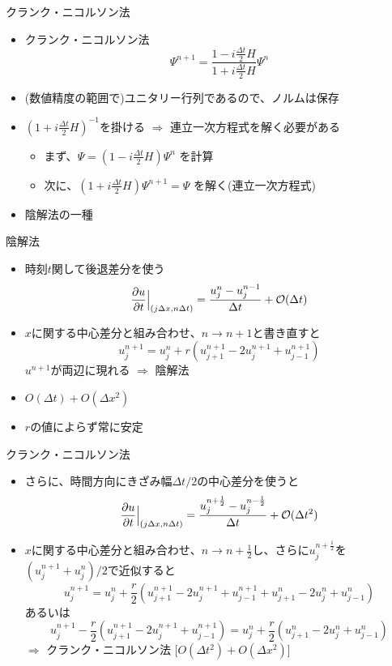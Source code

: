 \begin{frame}[t]{クランク・ニコルソン法}
  \begin{itemize}
  \item クランク・ニコルソン法
    \[
    \Psi^{n+1} = \frac{1 -  i \frac{\Delta t}{2} H}{1 +  i \frac{\Delta t}{2} H} \Psi^{n}
    \]
  \item (数値精度の範囲で)ユニタリー行列であるので、ノルムは保存
  \item $(1 +  i \frac{\Delta t}{2} H)^{-1}$を掛ける $\Rightarrow$ 連立一次方程式を解く必要がある
    \begin{itemize}
    \item まず、$\Psi = (1 - i \frac{\Delta t}{2} H) \Psi^n$ を計算
    \item 次に、$(1 +  i \frac{\Delta t}{2} H) \Psi^{n+1} = \Psi$ を解く(連立一次方程式)
    \end{itemize}
  \item 陰解法の一種
  \end{itemize}
\end{frame}

\begin{frame}[t]{陰解法}
  \begin{itemize}
  \item 時刻$t$関して後退差分を使う
    \[
    \frac{\partial u}{\partial t} \Big|_{(j \Delta x, n \Delta t)} = \frac{u_j^{n} - u_j^{n-1}}{\Delta t} + {\cal O}(\Delta t)
    \]
  \item $x$に関する中心差分と組み合わせ、$n \rightarrow n+1$と書き直すと
    \[
    u_{j}^{n+1} = u_{j}^{n} + r (u_{j+1}^{n+1} - 2 u_{j}^{n+1} + u_{j-1}^{n+1})
    \]
    $u^{n+1}$が両辺に現れる $\Rightarrow$ 陰解法
  \item $O(\Delta t) + O(\Delta x^2)$
  \item $r$の値によらず{\color{red}常に安定}
  \end{itemize}
\end{frame}

\begin{frame}[t]{クランク・ニコルソン法}
  \begin{itemize}
  \item さらに、時間方向にきざみ幅$\Delta t/2$の中心差分を使うと
    \[
    \frac{\partial u}{\partial t} \Big|_{(j \Delta x, n \Delta t)} = \frac{u_j^{n+\frac{1}{2}} - u_j^{n-\frac{1}{2}}}{\Delta t} + {\cal O}(\Delta t^2)
    \]
  \item $x$に関する中心差分と組み合わせ、$n \rightarrow n+\frac{1}{2}$し、さらに$u_j^{n+\frac{1}{2}}$を$(u_j^{n+1}+u_j^{n})/2$で近似すると
    \[
    u_{j}^{n+1} = u_{j}^{n} + \frac{r}{2} (u_{j+1}^{n+1} - 2 u_{j}^{n+1}  +u_{j-1}^{n+1} + u_{j+1}^{n} - 2 u_{j}^{n} + u_{j-1}^{n})
    \]
    あるいは
    \[
    u_{j}^{n+1} - \frac{r}{2} (u_{j+1}^{n+1} - 2 u_{j}^{n+1} + u_{j-1}^{n+1}) = u_{j}^{n} + \frac{r}{2} (u_{j+1}^{n} - 2 u_{j}^{n} + u_{j-1}^{n})
    \]
    $\Rightarrow$ クランク・ニコルソン法 [$O(\Delta t^2) + O(\Delta x^2)$]
  \end{itemize}
\end{frame}

